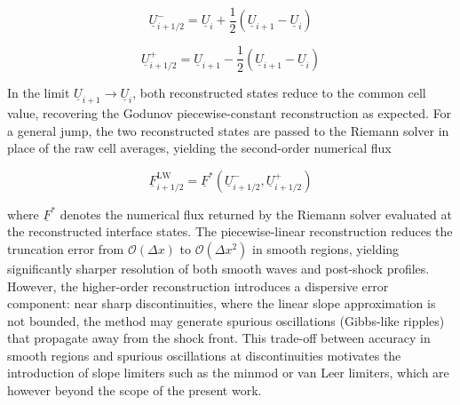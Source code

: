 \begin{equation}
\underline{U}_{i+1/2}^{-} = \underline{U}_i + \frac{1}{2}\left(\underline{U}_{i+1} - \underline{U}_i\right)
\label{eq:lw_left}
\end{equation}

\begin{equation}
\underline{U}_{i+1/2}^{+} = \underline{U}_{i+1} - \frac{1}{2}\left(\underline{U}_{i+1} - \underline{U}_i\right)
\label{eq:lw_right}
\end{equation}

In the limit \( \underline{U}_{i+1} \to \underline{U}_i \), both reconstructed states reduce to the common cell value, recovering the Godunov piecewise-constant reconstruction as expected. For a general jump, the two reconstructed states are passed to the Riemann solver in place of the raw cell averages, yielding the second-order numerical flux

\begin{equation}
\underline{F}_{i+1/2}^{\mathrm{LW}} = \underline{F}^*\left(\underline{U}_{i+1/2}^{-}, \underline{U}_{i+1/2}^{+}\right)
\label{eq:lw_flux}
\end{equation}

where \( \underline{F}^* \) denotes the numerical flux returned by the Riemann solver evaluated at the reconstructed interface states. The piecewise-linear reconstruction reduces the truncation error from \( \mathcal{O}(\Delta x) \) to \( \mathcal{O}(\Delta x^2) \) in smooth regions, yielding significantly sharper resolution of both smooth waves and post-shock profiles. However, the higher-order reconstruction introduces a dispersive error component: near sharp discontinuities, where the linear slope approximation is not bounded, the method may generate spurious oscillations (Gibbs-like ripples) that propagate away from the shock front. This trade-off between accuracy in smooth regions and spurious oscillations at discontinuities motivates the introduction of slope limiters such as the minmod or van Leer limiters, which are however beyond the scope of the present work.